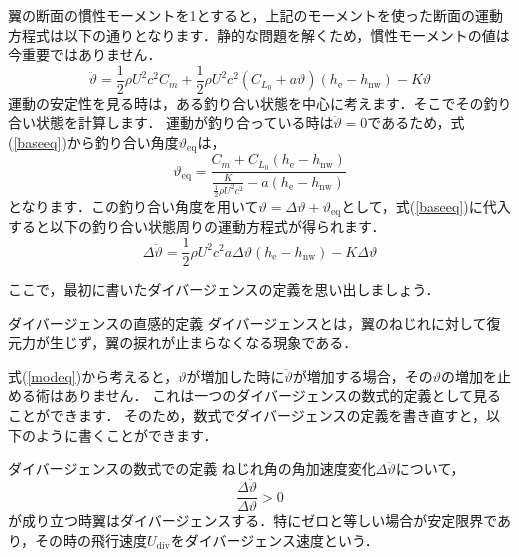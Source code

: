 \documentclass{jarticle}
\begin{document}
翼の断面の慣性モーメントを1とすると，上記のモーメントを使った断面の運動方程式は以下の通りとなります．静的な問題を解くため，慣性モーメントの値は今重要ではありません．
\begin{equation} \label{baseeq}
    \ddot{\vartheta} = \frac{1}{2}\rho U^2 c^2 C_m + \frac{1}{2}\rho U^2 c^2 (C_{L_0} + a\vartheta)  (h_\mathrm{e}-h_\mathrm{nw}) - K \vartheta
\end{equation}
運動の安定性を見る時は，ある釣り合い状態を中心に考えます．そこでその釣り合い状態を計算します．
運動が釣り合っている時は$\ddot{\vartheta}=0$であるため，式(\ref{baseeq})から釣り合い角度$\vartheta_\mathrm{eq}$は，
\begin{equation}
    \vartheta_\mathrm{eq} = \frac{C_m + C_{L_0}(h_\mathrm{e}-h_\mathrm{nw})}{ \frac{K}{\frac{1}{2}\rho U^2 c^2} - a(h_\mathrm{e}-h_\mathrm{nw})}
\end{equation}
となります．この釣り合い角度を用いて$\vartheta = \Delta \vartheta + \vartheta_\mathrm{eq}$として，式(\ref{baseeq})に代入すると以下の釣り合い状態周りの運動方程式が得られます．
\begin{equation} \label{modeq}
    \Delta \ddot{\vartheta} = \frac{1}{2}\rho U^2 c^2 a\Delta \vartheta  (h_\mathrm{e}-h_\mathrm{nw}) - K \Delta \vartheta
\end{equation}

ここで，最初に書いたダイバージェンスの定義を思い出しましょう．
\begin{itembox}[l]{ダイバージェンスの直感的定義}
    ダイバージェンスとは，翼のねじれに対して復元力が生じず，翼の捩れが止まらなくなる現象である．
\end{itembox}
式(\ref{modeq})から考えると，$\vartheta$が増加した時に$\ddot{\vartheta}$が増加する場合，その$\vartheta$の増加を止める術はありません．
これは一つのダイバージェンスの数式的定義として見ることができます．
そのため，数式でダイバージェンスの定義を書き直すと，以下のように書くことができます．
\begin{itembox}[l]{ダイバージェンスの数式での定義}
    ねじれ角の角加速度変化$\Delta \ddot{\vartheta}$について，
    \begin{equation*}
        \frac{\Delta \ddot{\vartheta}}{\Delta \vartheta} > 0
    \end{equation*}
    が成り立つ時翼はダイバージェンスする．特にゼロと等しい場合が安定限界であり，その時の飛行速度$U_\mathrm{div}$をダイバージェンス速度という．
\end{itembox}
\end{document}
